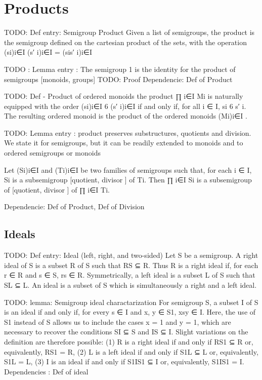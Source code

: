 \chapter {Products}

TODO: Def entry: Semigroup Product
Given a list of semigroups, the product is the semigroup defined on the 
cartesian product of the sets, with the operation 
(si)i∈I (s′
i)i∈I = (sis′
i)i∈I

TODO : Lemma entry : The semigroup 1 is the identity for the product of semigroups [monoids,
groups]
TODO: Proof
Dependencie: Def of Product

TODO: Def - Product of ordered monoids
the product ∏
i∈I Mi is naturally
equipped with the order
(si)i∈I 6 (s′
i)i∈I if and only if, for all i ∈ I, si 6 s′
i.
The resulting ordered monoid is the product of the ordered monoids (Mi)i∈I .

TODO: Lemma entry : 
product preserves
substructures, quotients and division. We state it for semigroups, but it can be
readily extended to monoids and to ordered semigroups or monoids

Let (Si)i∈I and (Ti)i∈I be two families of semigroups such
that, for each i ∈ I, Si is a subsemigroup [quotient, divisor ] of Ti. Then ∏
i∈I Si
is a subsemigroup of [quotient, divisor ] of ∏
i∈I Ti.

Dependencie: Def of Product, Def of Division

\section {Ideals}

TODO: Def entry: Ideal (left, right, and two-sided)
Let S be a semigroup. A right ideal of S is a subset R of S such that RS ⊆ R.
Thus R is a right ideal if, for each r ∈ R and s ∈ S, rs ∈ R. Symmetrically, a
left ideal is a subset L of S such that SL ⊆ L. An ideal is a subset of S which
is simultaneously a right and a left ideal.

TODO: lemma: Semigroup ideal charactarization
For semigroup S, a subset I of S is an ideal if and only if, for every s ∈ I and
x, y ∈ S1, xsy ∈ I. Here, the use of S1 instead of S allows us to include the
cases x = 1 and y = 1, which are necessary to recover the conditions SI ⊆ S
and IS ⊆ I. Slight variations on the definition are therefore possible:
(1) R is a right ideal if and only if RS1 ⊆ R or, equivalently, RS1 = R,
(2) L is a left ideal if and only if S1L ⊆ L or, equivalently, S1L = L,
(3) I is an ideal if and only if S1IS1 ⊆ I or, equivalently, S1IS1 = I.
Dependencies : Def of ideal

